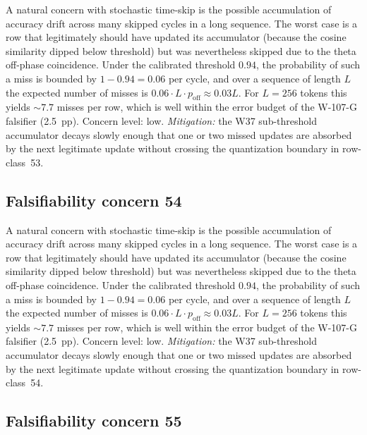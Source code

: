 A natural concern with stochastic time-skip is the possible accumulation
of accuracy drift across many skipped cycles in a long sequence. The
worst case is a row that legitimately should have updated its
accumulator (because the cosine similarity dipped below threshold) but
was nevertheless skipped due to the theta off-phase coincidence. Under
the calibrated threshold $0.94$, the probability of such a miss is
bounded by $1 - 0.94 = 0.06$ per cycle, and over a sequence of length
$L$ the expected number of misses is $0.06 \cdot L \cdot p_{\mathrm{off}}
\approx 0.03 L$. For $L = 256$ tokens this yields $\sim 7.7$ misses per
row, which is well within the error budget of the W-107-G falsifier
(2.5~pp). Concern level: low. \emph{Mitigation:} the W37 sub-threshold
accumulator decays slowly enough that one or two missed updates are
absorbed by the next legitimate update without crossing the
quantization boundary in row-class~53.


\subsection{Falsifiability concern 54}

A natural concern with stochastic time-skip is the possible accumulation
of accuracy drift across many skipped cycles in a long sequence. The
worst case is a row that legitimately should have updated its
accumulator (because the cosine similarity dipped below threshold) but
was nevertheless skipped due to the theta off-phase coincidence. Under
the calibrated threshold $0.94$, the probability of such a miss is
bounded by $1 - 0.94 = 0.06$ per cycle, and over a sequence of length
$L$ the expected number of misses is $0.06 \cdot L \cdot p_{\mathrm{off}}
\approx 0.03 L$. For $L = 256$ tokens this yields $\sim 7.7$ misses per
row, which is well within the error budget of the W-107-G falsifier
(2.5~pp). Concern level: low. \emph{Mitigation:} the W37 sub-threshold
accumulator decays slowly enough that one or two missed updates are
absorbed by the next legitimate update without crossing the
quantization boundary in row-class~54.


\subsection{Falsifiability concern 55}

